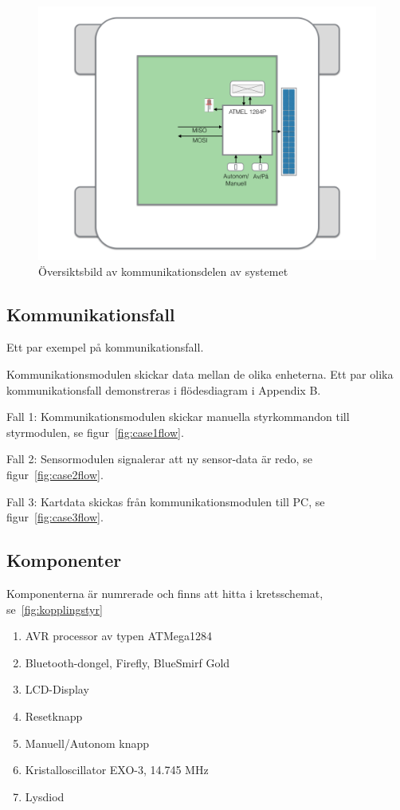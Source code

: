 \documentclass[a4paper,12pt,fleqn]{article}
\begin{document}
\begin{figure}[htp] %
  \begin{center}
  \includegraphics[keepaspectratio=true,width=\linewidth]{bilder/kom_overview.png}  %
  \end{center}
  \caption{Översiktsbild av kommunikationsdelen av systemet} %
  \label{fig:overviewKom}
\end{figure}
\newpage
\subsection{Kommunikationsfall}
Ett par exempel på kom\-mun\-ikations\-fall.

Kommunikationsmodulen skickar data mellan de olika enheterna. Ett par olika kommunikationsfall demonstreras i flödesdiagram i Appendix B.

Fall 1: Kommunikationsmodulen skickar manuella styrkommandon till styrmodulen, se figur~\ref{fig:case1flow}.

Fall 2: Sensormodulen signalerar att ny sensor-data är redo, se  figur~\ref{fig:case2flow}.

Fall 3: Kartdata skickas från kommunikationsmodulen till PC, se figur~\ref{fig:case3flow}. 
 
\subsection{Komponenter}
Komponenterna är numrerade och finns att hitta i kretsschemat, se~\ref{fig:kopplingstyr}
\begin{enumerate}
  \item AVR processor av typen ATMega1284
  \item Bluetooth-dongel, Firefly, BlueSmirf Gold
  \item LCD-Display
  \item Resetknapp
  \item Manuell/Autonom knapp
  \item Kristalloscillator EXO-3, 14.745 MHz
  \item Lysdiod
\end{enumerate}
\end{document}
